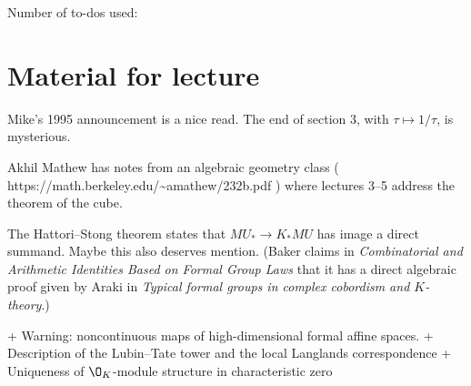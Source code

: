 \documentclass[12pt]{book}
\newcounter{todocounter}
\begin{document}
\mainmatter






\renewcommand\chaptername{Case Study}
\renewcommand\cftchappresnum{{Case Study}\space}












\appendix









\backmatter







\newpage

Number of to-dos used: \thetodocounter







\chapter*{Material for lecture}

Mike's 1995 announcement is a nice read.  The end of section 3, with $\tau \mapsto 1/\tau$, is mysterious.

Akhil Mathew has notes from an algebraic geometry class ( https://math.berkeley.edu/{\textasciitilde}amathew/232b.pdf ) where lectures 3--5 address the theorem of the cube.

The Hattori--Stong theorem states that $MU_* \to K_* MU$ has image a direct summand.  Maybe this also deserves mention.  (Baker claims in \textit{Combinatorial and Arithmetic Identities Based on Formal Group Laws} that it has a direct algebraic proof given by Araki in \textit{Typical formal groups in complex cobordism and $K$-theory}.)

+ Warning: noncontinuous maps of high-dimensional formal affine spaces.
+ Description of the Lubin--Tate tower and the local Langlands correspondence
+ Uniqueness of $\O_K$-module structure in characteristic zero
\end{document}
